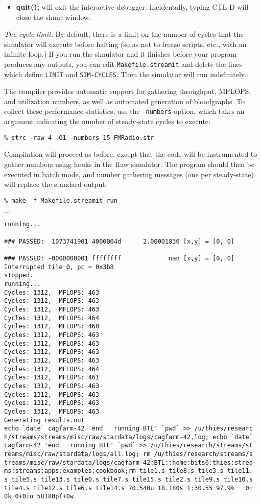 \begin{itemize}
\item {\bf quit();} will exit the interactive debugger.  Incidentally,
typing CTL-D will close the shunt window.

\end{itemize}

{\it The cycle limit.}  By default, there is a limit on the number of
cycles that the simulator will execute before halting (so as not to
freeze scripts, etc., with an infinite loop.)  If you run the
simulator and it finishes before your program produces any outputs,
you can edit {\tt Makefile.streamit} and delete the lines which define
{\tt LIMIT} and {\tt SIM-CYCLES}.  Then the simulator will run
indefinitely.

  The compiler provides automatic
support for gathering throughput, MFLOPS, and utilization numbers, as
well as automated generation of bloodgraphs.  To collect these
performance statistics, use the {\tt -numbers} option, which takes an
argument indicating the number of steady-state cycles to execute:
{\small
\begin{verbatim}
% strc -raw 4 -O1 -numbers 15 FMRadio.str
\end{verbatim}
} 
%
Compilation will proceed as before, except that the code will be
instrumented to gather numbers using hooks in the Raw simulator.  The
program should then be executed in batch mode, and number gathering
messages (one per steady-state) will replace the standard output: 
%
{\small
\begin{verbatim}
% make -f Makefile.streamit run
\end{verbatim}
$\dots$
\begin{verbatim}
running...

### PASSED:  1073741901 4000004d      2.00001836 [x,y] = [0, 0]

### PASSED: -0000000001 ffffffff             nan [x,y] = [0, 0]
Interrupted tile 0, pc = 0x3b8
stopped.
running...
Cycles: 1312,  MFLOPS: 463
Cycles: 1312,  MFLOPS: 463
Cycles: 1312,  MFLOPS: 463
Cycles: 1312,  MFLOPS: 464
Cycles: 1312,  MFLOPS: 460
Cycles: 1312,  MFLOPS: 463
Cycles: 1312,  MFLOPS: 463
Cycles: 1312,  MFLOPS: 463
Cycles: 1312,  MFLOPS: 463
Cycles: 1312,  MFLOPS: 464
Cycles: 1312,  MFLOPS: 461
Cycles: 1312,  MFLOPS: 463
Cycles: 1312,  MFLOPS: 463
Cycles: 1312,  MFLOPS: 463
Cycles: 1312,  MFLOPS: 463
Generating results.out
echo `date` cagfarm-42 'end   running BTL' `pwd` >> /u/thies/researc
h/streams/streams/misc/raw/stardata/logs/cagfarm-42.log; echo `date`
cagfarm-42 'end   running BTL' `pwd` >> /u/thies/research/streams/st
reams/misc/raw/stardata/logs/all.log; rm /u/thies/research/streams/s
treams/misc/raw/stardata/logs/cagfarm-42:BTL::home:bits6:thies:strea
ms:streams:apps:examples:cookbook;rm tile1.s tile8.s tile3.s tile11.
s tile5.s tile13.s tile0.s tile7.s tile15.s tile2.s tile9.s tile10.s
tile4.s tile12.s tile6.s tile14.s 70.540u 18.180s 1:30.55 97.9%   0+
0k 0+0io 58180pf+0w
\end{verbatim}
} 
